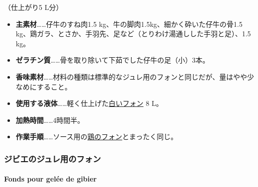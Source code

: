 \begin{recette}

（仕上がり5 L分）

\begin{itemize}
\item
  \textbf{主素材}\ldots{}\ldots{}仔牛のすね肉1.5
  kg、牛の脚肉1.5kg、細かく砕いた仔牛の骨1.5
  kg、鶏ガラ、とさか、手羽先、足など（とりわけ湯通しした手羽と足）、1.5
  kg。
\item
  \textbf{ゼラチン質}\ldots{}\ldots{}骨を取り除いて下茹でした仔牛の足（小）3本。
\item
  \textbf{香味素材}\ldots{}\ldots{}材料の種類は標準的なジュレ用のフォンと同じだが、量はやや少なめにすること。
\item
  \textbf{使用する液体}\ldots{}\ldots{}軽く仕上げた\protect\hyperlink{fonds-blanc}{白いフォン}
  8 L。
\item
  \textbf{加熱時間}\ldots{}\ldots{}4時間半。
\item
  \textbf{作業手順}\ldots{}\ldots{}ソース用の\protect\hyperlink{fonds-de-volaille}{鶏のフォン}とまったく同じ。
\end{itemize}

\maeaki

\hypertarget{ux30b8ux30d3ux30a8ux306eux30b8ux30e5ux30ecux7528ux306eux30d5ux30a9ux30f3}{%
\subsubsection{ジビエのジュレ用のフォン}\label{ux30b8ux30d3ux30a8ux306eux30b8ux30e5ux30ecux7528ux306eux30d5ux30a9ux30f3}}

\hypertarget{fonds-pour-gelee-de-gibier}{%
\paragraph{Fonds pour gelée de
gibier}\label{fonds-pour-gelee-de-gibier}}



\end{recette}
